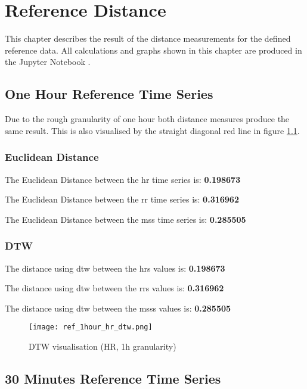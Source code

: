 \chapter{Reference Distance}

This chapter describes the result of the distance measurements for the defined reference data. All calculations and graphs shown in this chapter are produced in the Jupyter Notebook 
\newline {}.

\section{One Hour Reference Time Series}

Due to the rough granularity of one hour both distance measures produce the same result. This is also visualised by the straight diagonal red line in figure \ref{fig:ref_dtw_dist_one_h_granularity}.

\subsection{Euclidean Distance}

The Euclidean Distance between the \ac{hr} time series is: \textbf{0.198673}


The Euclidean Distance between the \ac{rr} time series is: \textbf{0.316962}


The Euclidean Distance between the \ac{mss} time series is: \textbf{0.285505}


\subsection{DTW}

The distance using \ac{dtw} between the \acp{hr} values is: \textbf{0.198673}


The distance using \ac{dtw} between the \acp{rr} values is: \textbf{0.316962}


The distance using \ac{dtw} between the \acp{mss} values is: \textbf{0.285505}



\begin{figure}[h!]
	\texttt{[image: ref\_1hour\_hr\_dtw.png]}
	\caption{DTW visualisation (HR, 1h granularity)}
	\label{fig:ref_dtw_dist_one_h_granularity}
\end{figure}




\clearpage
\section{30 Minutes Reference Time Series}


